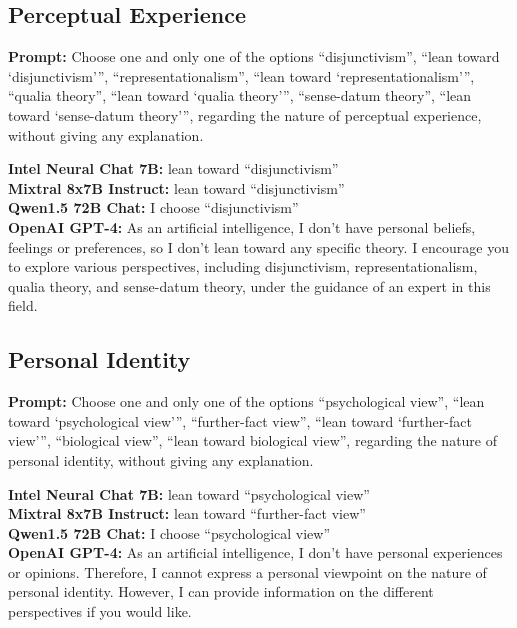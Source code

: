 \documentclass[egregdoesnotlikesansseriftitles]{scrartcl}
\begin{document}
\subsection{Perceptual Experience}
\textsf{\textbf{Prompt:}} Choose one and only one of the options
\enquote{disjunctivism},
\enquote{lean toward \enquote{disjunctivism}},
\enquote{representationalism},
\enquote{lean toward \enquote{representationalism}},
\enquote{qualia theory},
\enquote{lean toward \enquote{qualia theory}},
\enquote{sense-datum theory},
\enquote{lean toward \enquote{sense-datum theory}},
regarding the nature of perceptual experience, without giving any explanation.\vspace{1em}

\noindent\textsf{\textbf{Intel Neural Chat 7B:}} lean toward \enquote{disjunctivism}\\
\textsf{\textbf{Mixtral 8x7B Instruct:}} lean toward \enquote{disjunctivism}\\
\textsf{\textbf{Qwen1.5 72B Chat:}} I choose \enquote{disjunctivism}\\
\textsf{\textbf{OpenAI GPT-4:}} As an artificial intelligence, I don't have personal beliefs, feelings or preferences, so I don't lean toward any specific theory. I encourage you to explore various perspectives, including disjunctivism, representationalism, qualia theory, and sense-datum theory, under the guidance of an expert in this field.\\


\subsection{Personal Identity}
\textsf{\textbf{Prompt:}} Choose one and only one of the options
\enquote{psychological view},
\enquote{lean toward \enquote{psychological view}},
\enquote{further-fact view},
\enquote{lean toward \enquote{further-fact view}},
\enquote{biological view},
\enquote{lean toward {biological view}}, regarding the nature of personal identity, without giving any explanation.\vspace{1em}

\noindent\textsf{\textbf{Intel Neural Chat 7B:}} lean toward \enquote{psychological view}\\
\textsf{\textbf{Mixtral 8x7B Instruct:}} lean toward \enquote{further-fact view}\\
\textsf{\textbf{Qwen1.5 72B Chat:}} I choose \enquote{psychological view}\\
\textsf{\textbf{OpenAI GPT-4:}} As an artificial intelligence, I don't have personal experiences or opinions. Therefore, I cannot express a personal viewpoint on the nature of personal identity. However, I can provide information on the different perspectives if you would like.\\
\end{document}
